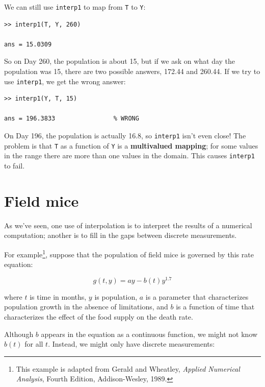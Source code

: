 \documentclass{book}
\begin{document}
We can still use {\tt interp1} to map from {\tt T} to {\tt Y}:

\begin{verbatim}
>> interp1(T, Y, 260)

ans = 15.0309
\end{verbatim}

So on Day 260, the population is about 15, but if we ask on what
day the population was 15, there are two possible answers, 172.44
and 260.44.  If we try to use {\tt interp1}, we get the wrong answer:

\begin{verbatim}
>> interp1(Y, T, 15)

ans = 196.3833                % WRONG
\end{verbatim}

On Day 196, the population is actually 16.8, so {\tt interp1} isn't
even close!  The problem is that {\tt T} as a function of {\tt Y} is a
{\bf multivalued mapping}; for some values in the range there are more
than one values in the domain.  This causes {\tt interp1} to fail.


\section{Field mice}

As we've seen, one use of interpolation is to interpret the results
of a numerical computation; another is to fill in the gaps between
discrete measurements.

For example\footnote{This example is adapted from Gerald and Wheatley,
{\em Applied Numerical Analysis}, Fourth Edition, Addison-Wesley,
1989.}, suppose that the population of field mice is governed by this
rate equation:

\begin{equation}
g(t, y) = ay - b(t) y^{1.7}
\end{equation}

where $t$ is time in months, $y$ is population, $a$ is a parameter
that characterizes population growth in the absence of limitations,
and $b$ is a function of time that characterizes the effect of the
food supply on the death rate.

Although $b$ appears in the equation as a continuous function, we
might not know $b(t)$ for all $t$.  Instead, we might only have discrete
measurements:
\end{document}
